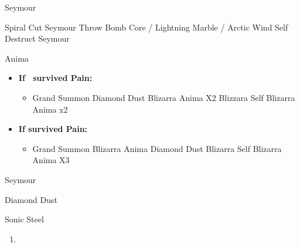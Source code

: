 \begin{battle}[3000]{Seymour}
	\begin{itemize}
		\tidusf Spiral Cut Seymour
		\switch{\yuna}{\rikku}
		\rikkuf Throw Bomb Core / Lightning Marble / Arctic Wind
		\kimahrif Self Destruct Seymour
	\end{itemize}
\end{battle}
\begin{battle}[18000]{Anima}
	\begin{itemize}
		\rikkuf Steal
		\enemyf Pain
		\item \textbf{If \rikku\ survived Pain:}
		\begin{itemize}
			\switch{\rikku}{\yuna}
			\item Grand Summon \shiva
			\shivaf Diamond Dust
			\shivaf Blizarra Anima X2
			\shivaf Blizzara Self
			\shivaf Blizarra Anima x2
		\end{itemize}
		\item \textbf{If \tidus survived Pain:}
		\begin{itemize}
			\switch{\tidus}{\yuna}
			\item Grand Summon \shiva
			\shivaf Blizarra Anima
			\shivaf Diamond Dust
			\shivaf Blizarra Self
			\shivaf Blizarra Anima X3
		\end{itemize}
	\end{itemize}
\end{battle}
\begin{battle}[6000]{Seymour}
	\begin{itemize}
		\shivaf Diamond Dust
	\end{itemize}
\end{battle}
\begin{equip}
	\begin{itemize}
		\tidusf Sonic Steel
	\end{itemize}
\end{equip}
\winvfill
\begin{enumerate}[resume]
	\item \formation{\tidus}{\rikku}{\yuna}
\end{enumerate}
